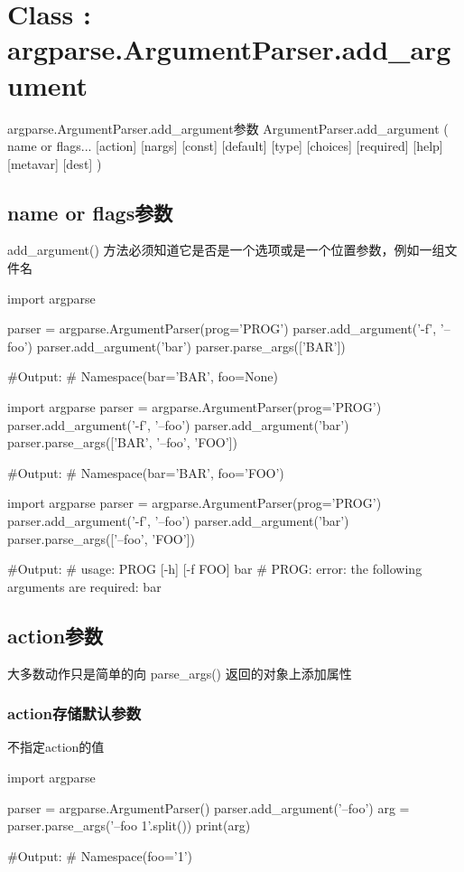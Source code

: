 \documentclass[11pt]{article}
\begin{document}
\section{Class : argparse.ArgumentParser.add\_argument}
 	\begin{Python}{argparse.ArgumentParser.add\_argument参数}
 		ArgumentParser.add_argument
 		(
 		name or flags...
 		[action]
 		[nargs]
 		[const]
 		[default]
 		[type]
 		[choices]
 		[required]
 		[help]
 		[metavar]
 		[dest]
 		)
 	\end{Python}
 
\subsection{name or flags参数}
 	add\_argument() 方法必须知道它是否是一个选项或是一个位置参数，例如一组文件名
 	\begin{Python}
import argparse

parser = argparse.ArgumentParser(prog='PROG')
parser.add_argument('-f', '--foo')
parser.add_argument('bar')
parser.parse_args(['BAR'])

#Output:
#		Namespace(bar='BAR', foo=None)

import argparse
parser = argparse.ArgumentParser(prog='PROG')
parser.add_argument('-f', '--foo')
parser.add_argument('bar')
parser.parse_args(['BAR', '--foo', 'FOO'])

#Output:
#		Namespace(bar='BAR', foo='FOO')

import argparse
parser = argparse.ArgumentParser(prog='PROG')
parser.add_argument('-f', '--foo')
parser.add_argument('bar')
parser.parse_args(['--foo', 'FOO'])

#Output:
#		usage: PROG [-h] [-f FOO] bar
#		PROG: error: the following arguments are required: bar
 	\end{Python}
\subsection{action参数}
 	
 	大多数动作只是简单的向 parse\_args() 返回的对象上添加属性
 	
\subsubsection{action存储默认参数}
 	
 	\begin{Python}{不指定action的值}
 	
import argparse

parser = argparse.ArgumentParser()
parser.add_argument('--foo')
arg = parser.parse_args('--foo 1'.split())
print(arg)

#Output:
#		Namespace(foo='1')		
 	\end{Python}
\end{document}
